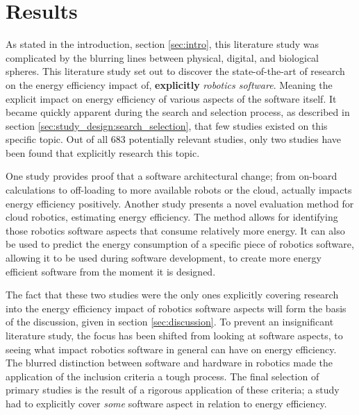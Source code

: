 \section{Results}
\label{sec:results}
As stated in the introduction, section \ref{sec:intro}, this literature study was complicated by 
the blurring lines between physical, digital, and biological spheres.
This literature study set out to discover the state-of-the-art of research on the energy efficiency impact of, \textbf{explicitly} \textit{robotics software}.
Meaning the explicit impact on energy efficiency of various aspects of the software itself.
It became quickly apparent during the search and selection process, as described in section \ref{sec:study_design:search_selection}, 
that few studies existed on this specific topic.
Out of all 683 potentially relevant studies, only two studies have been found that explicitly research this topic.

\vspace{2mm}

One study \cite{rahman2019cloud_robot_offloading} provides proof that a software architectural change; 
from on-board calculations to off-loading to more available robots or the cloud, actually impacts energy efficiency positively.
Another study \cite{hou2017novel_cloud_evaluation_model} presents a novel evaluation method for cloud robotics, estimating energy efficiency.
The method allows for identifying those robotics software aspects that consume relatively more energy. 
It can also be used to predict the energy consumption of a specific piece of robotics software, allowing it to be used during software development, 
to create more energy efficient software from the moment it is designed.

\vspace{2mm}

The fact that these two studies were the only ones explicitly covering research into the energy efficiency impact of robotics software aspects will
form the basis of the discussion, given in section \ref{sec:discussion}.
To prevent an insignificant literature study, the focus has been shifted from looking at software aspects, to seeing what impact 
robotics software in general can have on energy efficiency. The blurred distinction between software and hardware in robotics made the 
application of the inclusion criteria a tough process.
The final selection of primary studies is the result of a rigorous application of these criteria; 
a study had to explicitly cover \textit{some} software aspect in relation to energy efficiency.

